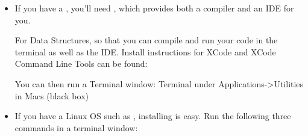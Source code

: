 \documentclass[letterpaper,10pt,english]{sphinxmanual}
\begin{document}
\begin{itemize}
\item {} 
If you have a , you’ll need , which provides both a
compiler and an IDE for you.

For Data Structures,  so that you can compile and run your code in the
terminal as well as the IDE. Install instructions for XCode and
XCode Command Line Tools can be found:


You can then run a Terminal window: Terminal under
Applications-\textgreater{}Utilities in Macs (black box)

\item {} 
If you have a Linux OS such as , installing is easy. Run
the following three commands in a terminal window:

%
\begin{sphinxVerbatim}[commandchars=\\\{\}]
   
   
    
\end{sphinxVerbatim}

\end{itemize}
\end{document}

